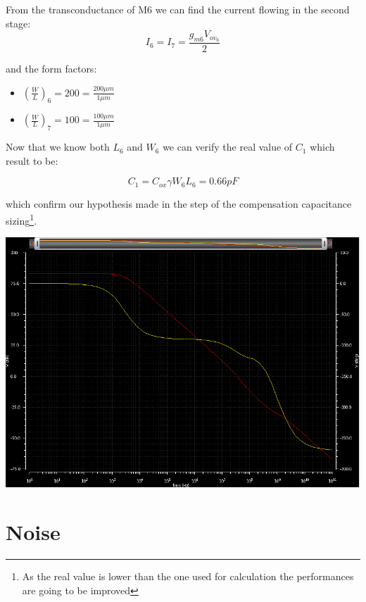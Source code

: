 From the transconductance of M6 we can find the current flowing in the second stage:
\begin{equation}
  I_6=I_7= \frac{g_{m6}V_{ov_6}}{2}
\end{equation}

and the form factors:

\begin{itemize}
    \item $(\frac{W}{L})_6=200=\frac{200 \mu m}{1 \mu m}$
 
    \item $(\frac{W}{L})_7=100=\frac{100 \mu m}{1 \mu m}$
    
  \end{itemize}  

Now that we know both $L_6$ and $W_6$ we can verify the real value of $C_1$ which result to be:

\begin{equation}
  C_1 = C_{ox} \gamma W_6 L_6 = 0.66pF
\end{equation}

which confirm our hypothesis made in the step of the compensation capacitance sizing\footnote{As the real value is lower than the one used for calculation the performances are going to be improved}.

\centering
\includegraphics[width=1\textwidth]{Capitoli/gainph1.png}
\raggedright



\vfill
\section{Noise} %
\label{sec:noise}


